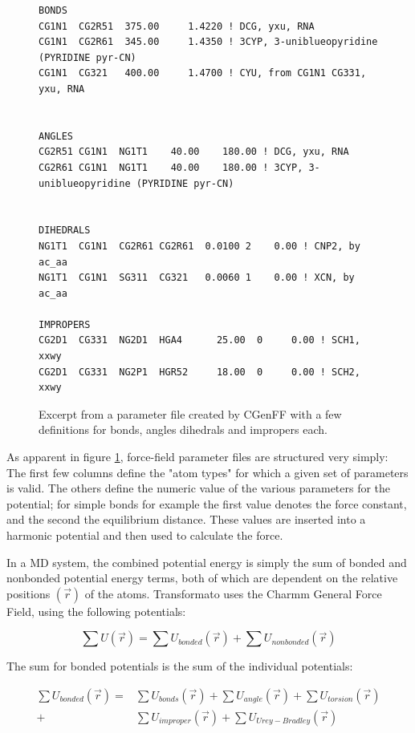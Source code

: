\documentclass[oneside]{scrreprt}
\begin{document}
\begin{figure}
\small
\begin{verbatim}
BONDS
CG1N1  CG2R51  375.00     1.4220 ! DCG, yxu, RNA
CG1N1  CG2R61  345.00     1.4350 ! 3CYP, 3-uniblueopyridine (PYRIDINE pyr-CN)
CG1N1  CG321   400.00     1.4700 ! CYU, from CG1N1 CG331, yxu, RNA
        

ANGLES
CG2R51 CG1N1  NG1T1    40.00    180.00 ! DCG, yxu, RNA
CG2R61 CG1N1  NG1T1    40.00    180.00 ! 3CYP, 3-uniblueopyridine (PYRIDINE pyr-CN)


DIHEDRALS
NG1T1  CG1N1  CG2R61 CG2R61  0.0100 2    0.00 ! CNP2, by ac_aa
NG1T1  CG1N1  SG311  CG321   0.0060 1    0.00 ! XCN, by ac_aa

IMPROPERS
CG2D1  CG331  NG2D1  HGA4      25.00  0     0.00 ! SCH1, xxwy
CG2D1  CG331  NG2P1  HGR52     18.00  0     0.00 ! SCH2, xxwy

\end{verbatim}
   \caption{Excerpt from a parameter file created by CGenFF with a few definitions for bonds, angles dihedrals and impropers each.}
    \label{fig:parmfile}
\end{figure}

As apparent in figure \ref{fig:parmfile}, force-field parameter files are structured very simply: The first few columns define the "atom types" for which a given set of parameters is valid. The others define the numeric value of the various parameters for the potential; for simple bonds for example the first value denotes the force constant, and the second the equilibrium distance. These values are inserted into a harmonic potential and then used to calculate the force. 


In a MD system, the combined potential energy is simply the sum of bonded and nonbonded potential energy terms, both of which are dependent on the relative positions $(\Vec{r})$ of the atoms. Transformato uses the Charmm General Force Field\cite{vanommeslaeghe_charmm_2010}, using the following potentials:


\begin{equation}
    \sum U (\Vec{r}) = \sum U_{bonded} (\Vec{r}) + \sum U_{nonbonded} (\Vec{r})
\end{equation}

The sum for bonded potentials is the sum of the individual potentials:

\begin{equation}
\begin{aligned}
    \sum U_{bonded} (\Vec{r})= &\sum U_{bonds} (\Vec{r}) + \sum U_{angle} (\Vec{r}) + \sum U_{torsion} (\Vec{r}) \\
    +&\sum U_{improper} (\Vec{r})+\sum U_{Urey-Bradley} (\Vec{r})
\end{aligned}
\end{equation}
\end{document}
